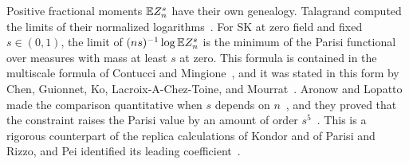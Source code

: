 Positive fractional moments $\mathbb E Z_n^s$ have their own genealogy. Talagrand
computed the limits of their normalized logarithms~\cite{talagrand-2007-large-deviations}.
For SK at zero field and fixed $s\in(0,1)$, the limit of
$(ns)^{-1}\log\mathbb E Z_n^s$ is the minimum of the Parisi functional over measures
with mass at least $s$ at zero. This formula is contained in the multiscale
formula of Contucci and Mingione~\cite[Theorem~2.1]{contucci-mingione-2019},
and it was stated in this form by Chen, Guionnet, Ko, Lacroix-A-Chez-Toine,
and Mourrat~\cite[Theorem~2.1]{chen-guionnet-ko-lacroix-mourrat-2026}. Aronow
and Lopatto made the comparison quantitative when $s$ depends on
$n$~\cite[Theorem~1.1]{quantitative-parisi}, and they proved that the
constraint raises the Parisi value by an amount of order
$s^5$~\cite[Lemma~7.2 and Proposition~7.3]{quantitative-parisi}. This is a
rigorous counterpart of the replica calculations of Kondor and of Parisi and
Rizzo, and Pei identified its leading
coefficient~\cite[Theorem~1(a)]{pei-fifth-order-2026}.

